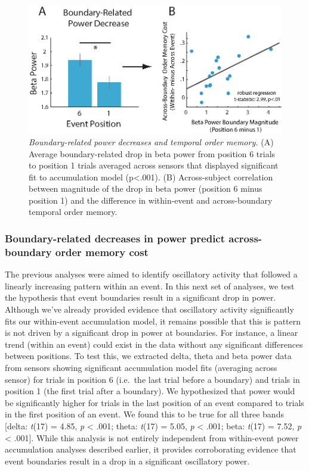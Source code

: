 \begin{figure}
  \centering
  \includegraphics[width=\textwidth]{figures/chapter2_figure5.eps}
  \caption[Boundary-related power decreases and temporal order memory.]{\textit{Boundary-related power decreases and temporal order memory.} (A) Average boundary-related drop in beta power from position 6 trials to position 1 trials averaged across sensors that displayed significant fit to accumulation model (p<.001).  (B) Across-subject correlation between magnitude of the drop in beta power (position 6 minus position 1) and the difference in within-event and across-boundary temporal order memory.}
  \label{chapter2_figure5}
\end{figure}

\subsubsection{Boundary-related decreases in power predict
across-boundary order memory
cost}\label{boundary-related-decreases-in-power-predict-across-boundary-order-memory-cost}

The previous analyses were aimed to identify oscillatory activity that
followed a linearly increasing pattern within an event. In this next set
of analyses, we test the hypothesis that event boundaries result in a
significant drop in power. Although we've already provided evidence that
oscillatory activity significantly fits our within-event accumulation
model, it remains possible that this is pattern is not driven by a
significant drop in power at boundaries. For instance, a linear trend
(within an event) could exist in the data without any significant
differences between positions. To test this, we extracted delta, theta
and beta power data from sensors showing significant accumulation model
fits (averaging across sensor) for trials in position 6 (i.e.~the last
trial before a boundary) and trials in position 1 (the first trial after
a boundary). We hypothesized that power would be significantly higher
for trials in the last position of an event compared to trials in the
first position of an event. We found this to be true for all three bands
{[}delta: \emph{t}(17) = 4.85, \emph{p} \textless{} .001; theta:
\emph{t}(17) = 5.05, \emph{p} \textless{} .001; beta: \emph{t}(17) =
7.52, \emph{p} \textless{} .001{]}. While this analysis is not entirely
independent from within-event power accumulation analyses described
earlier, it provides corroborating evidence that event boundaries result
in a drop in a significant oscillatory power.

